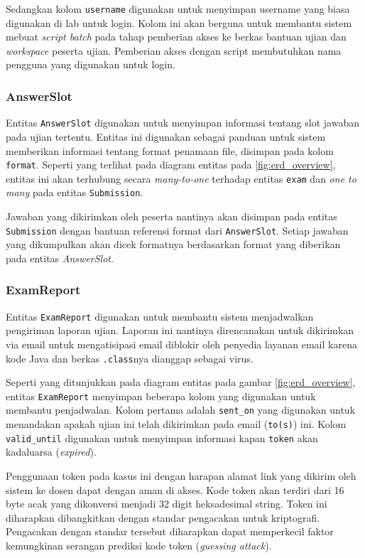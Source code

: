     Sedangkan kolom \texttt{username} digunakan untuk menyimpan username yang
    biasa digunakan di lab untuk login. Kolom ini akan berguna untuk membantu
    sistem mebuat \textit{script batch} pada tahap pemberian akses ke berkas
    bantuan ujian dan \textit{workspace} peserta ujian. Pemberian akses dengan
    script membutuhkan nama pengguna yang digunakan untuk login.
    
\subsubsection{AnswerSlot}
    Entitas \texttt{AnswerSlot} digunakan untuk menyimpan informasi tentang slot
    jawaban pada ujian tertentu. Entitas ini digunakan sebagai panduan untuk
    sistem memberikan informasi tentang format penamaan file, disimpan pada
    kolom \texttt{format}. Seperti yang terlihat pada diagram entitas pada
    \ref{fig:erd_overview}, entitas ini akan terhubung secara
    \textit{many-to-one} terhadap entitas \texttt{exam} dan \textit{one to many}
    pada entitas \texttt{Submission}.
    
    Jawaban yang dikirimkan oleh peserta nantinya akan disimpan pada entitas
    \texttt{Submission} dengan bantuan referensi format dari
    \texttt{AnswerSlot}. Setiap jawaban yang dikumpulkan akan dicek formatnya
    berdasarkan format yang diberikan pada entitas \textit{AnswerSlot}.

\subsubsection{ExamReport}
    Entitas \texttt{ExamReport} digunakan untuk membantu sistem menjadwalkan
    pengiriman laporan ujian. Laporan ini nantinya direncanakan untuk dikirimkan
    via email untuk mengatisipasi email diblokir oleh penyedia layanan email
    karena kode Java dan berkas \texttt{.class}nya dianggap sebagai virus.
    
    Seperti yang ditunjukkan pada diagram entitas pada gambar
    \ref{fig:erd_overview}, entitas \texttt{ExamReport} menyimpan beberapa kolom
    yang digunakan untuk membantu penjadwalan. Kolom pertama adalah
    \texttt{sent\_on} yang digunakan untuk menandakan apakah ujian ini telah
    dikirimkan pada email (\texttt{to(s)}) ini. Kolom \texttt{valid\_until}
    digunakan untuk menyimpan informasi kapan \texttt{token} akan kadaluarsa
    (\textit{expired}).
    
    Penggunaan token pada kasus ini dengan harapan alamat link yang dikirim oleh
    sistem ke dosen dapat dengan aman di akses. Kode token akan terdiri dari 16
    byte acak yang dikonversi menjadi 32 digit heksadesimal string. Token ini
    diharapkan dibangkitkan dengan standar pengacakan untuk kriptografi.
    Pengacakan dengan standar tersebut diharapkan dapat memperkecil faktor
    kemungkinan serangan prediksi kode token (\textit{guessing attack}).

